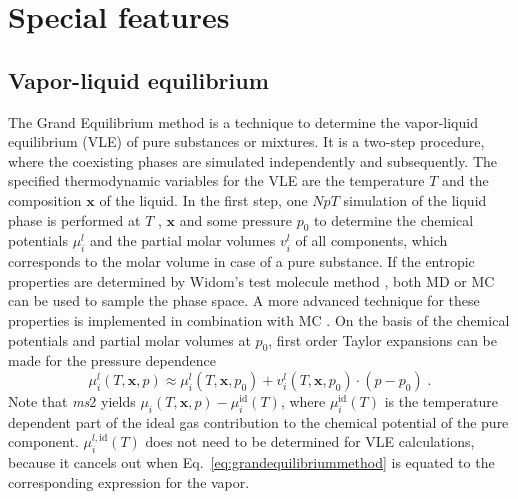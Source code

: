 \section{Special features}
\label{sec:special features}


\subsection{Vapor-liquid equilibrium}
\label{sec:Vapour-liquid equilibrium}

The Grand Equilibrium method is a technique to determine the vapor-liquid equilibrium (VLE) of pure substances or mixtures. It is a two-step procedure, where the coexisting phases are simulated independently and subsequently. The specified thermodynamic variables for the VLE are the temperature $T$ and the composition $\textbf{x}$ of the liquid. In the first step, one $NpT$ simulation of the liquid phase is performed at $T$ , $\textbf{x}$ and some pressure $p_{0}$ to determine the chemical potentials $\mu^{l}_{i}$ and the partial molar volumes $v^{l}_{i}$ of all components, which corresponds to the molar volume in case of a pure substance. If the entropic properties are determined by Widom's test molecule method \parencite{widom}, both MD or MC can be used to sample the phase space. A more advanced technique for these properties is implemented in combination with MC \parencite{lyubartsev1, nezbeda}. On the basis of the chemical potentials and partial molar volumes at $p_{0}$, first order Taylor expansions can be made for the pressure dependence
\begin{equation}
\mu^{l}_{i}(T,\textbf{x},p)\approx \mu^{l}_{i}(T,\textbf{x},p_{0})+v^{l}_{i}(T,\textbf{x},p_{0})\cdot (p-p_{0}) \;.
\label{eq:grandequilibriummethod}
\end{equation}
Note that \textit{ms}2 yields $\mu_{i}(T,\textbf{x},p)-\mu^\text{id}_{i}(T)$, where $\mu^\text{id}_{i}(T)$ is the temperature dependent part of the ideal gas contribution to the chemical potential of the pure component. $\mu^{l,\text{id}}_{i}(T)$ does not need to be determined for VLE calculations, because it cancels out when Eq.~\eqref{eq:grandequilibriummethod} is equated to the corresponding expression for the vapor.

